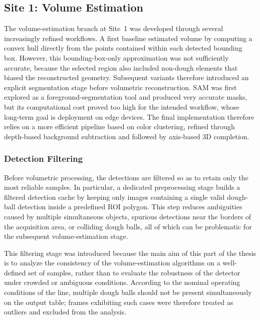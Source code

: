 
\subsection{Site 1: Volume Estimation}
The volume-estimation branch at Site~1 was developed through several increasingly refined workflows. A first baseline estimated volume by computing a convex hull directly from the points contained within each detected bounding box. However, this bounding-box-only approximation was not sufficiently accurate, because the selected region also included non-dough elements that biased the reconstructed geometry. Subsequent variants therefore introduced an explicit segmentation stage before volumetric reconstruction. SAM \cite{kirillov_segment_2023} was first explored as a foreground-segmentation tool and produced very accurate masks, but its computational cost proved too high for the intended workflow, whose long-term goal is deployment on edge devices. The final implementation therefore relies on a more efficient pipeline based on color clustering, refined through depth-based background subtraction and followed by axis-based 3D completion.\cite{labby_thesis_repo_2026}

\subsubsection{Detection Filtering}
Before volumetric processing, the detections are filtered so as to retain only the most reliable samples. In particular, a dedicated preprocessing stage builds a filtered detection cache by keeping only images containing a single valid dough-ball detection inside a predefined ROI polygon. This step reduces ambiguities caused by multiple simultaneous objects, spurious detections near the borders of the acquisition area, or colliding dough balls, all of which can be problematic for the subsequent volume-estimation stage.

This filtering stage was introduced because the main aim of this part of the thesis is to analyze the consistency of the volume-estimation algorithms on a well-defined set of samples, rather than to evaluate the robustness of the detector under crowded or ambiguous conditions. According to the nominal operating conditions of the line, multiple dough balls should not be present simultaneously on the output table; frames exhibiting such cases were therefore treated as outliers and excluded from the analysis.
\newpage

